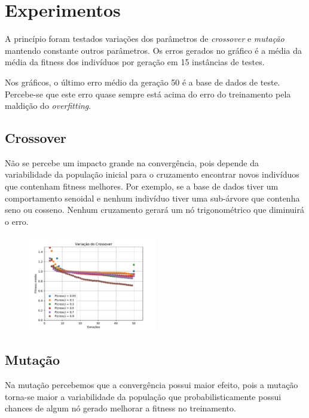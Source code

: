 \section{Experimentos}

A princípio foram testados variações dos parâmetros de \textit{crossover} e \textit{mutação} mantendo constante outros parâmetros. Os erros gerados no gráfico é a média da média da fitness dos indivíduos por geração em 15 instâncias de testes.

Nos gráficos, o último erro médio da geração 50 é a base de dados de teste. Percebe-se que este erro quase sempre está acima do erro do treinamento pela maldição do \textit{overfitting}.

\subsection{Crossover}

Não se percebe um impacto grande na convergência, pois depende da variabilidade da população inicial para o cruzamento encontrar novos indivíduos que contenham fitness melhores. Por exemplo, se a base de dados tiver um comportamento senoidal e nenhum indivíduo tiver uma sub-árvore que contenha seno ou cosseno. Nenhum cruzamento gerará um nó trigonométrico que diminuirá o erro.

\begin{figure}[H]
  \centering
  \includegraphics[width=0.5\textwidth]{pdf/varcrossover.pdf}
  \label{fig:varcross}
\end{figure}

\subsection{Mutação}

Na mutação percebemos que a convergência possui maior efeito, pois a mutação torna-se maior a variabilidade da população que probabilisticamente possui chances de algum nó gerado melhorar a fitness no treinamento.


